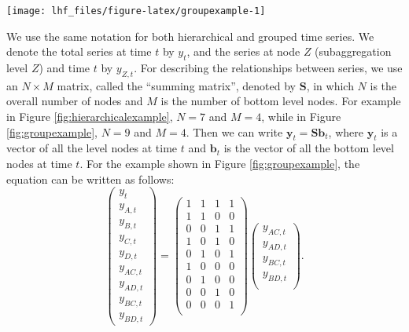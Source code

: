 \documentclass[11pt,a4paper,]{article}
\let\origfigure\figure
\let\endorigfigure\endfigure
\renewenvironment{figure}[1][2] {
    \expandafter\origfigure\expandafter[!htbp]
} {
    \endorigfigure
}
\begin{document}
\begin{figure}

{\centering \texttt{[image: lhf\_files/figure-latex/groupexample-1]} 

}

\caption{An example of a two level grouped structure.}\label{fig:groupexample}
\end{figure}

We use the same notation \autocite[following][]{fpp2} for both hierarchical and grouped time series. We denote the total series at time \(t\) by \(y_t\), and the series at node \(Z\) (subaggregation level \(Z\)) and time \(t\) by \(y_{Z,t}\). For describing the relationships between series, we use an \(N\times M\) matrix, called the ``summing matrix'', denoted by \(\bm{S}\), in which \(N\) is the overall number of nodes and \(M\) is the number of bottom level nodes. For example in Figure \ref{fig:hierarchicalexample}, \(N = 7\) and \(M = 4\), while in Figure \ref{fig:groupexample}, \(N=9\) and \(M=4\). Then we can write \(\bm{y}_t=\bm{S}\bm{b}_t\), where \(\bm{y}_t\) is a vector of all the level nodes at time \(t\) and \(\bm{b}_t\) is the vector of all the bottom level nodes at time \(t\). For the example shown in Figure \ref{fig:groupexample}, the equation can be written as follows:
\begin{equation}\label{eq:Smatrixexample}
  \begin{pmatrix}
    y_{t}\\y_{A,t}\\y_{B,t}\\y_{C,t}\\y_{D,t}\\y_{AC,t}\\y_{AD,t}\\y_{BC,t}\\y_{BD,t}
  \end{pmatrix} =
  \begin{pmatrix}
    1&1&1&1\\1&1&0&0\\0&0&1&1\\1&0&1&0\\0&1&0&1\\1&0&0&0\\0&1&0&0\\0&0&1&0\\0&0&0&1\\
  \end{pmatrix}
  \begin{pmatrix}
    y_{AC,t}\\y_{AD,t}\\y_{BC,t}\\y_{BD,t}\\
  \end{pmatrix}.
\end{equation}
\end{document}
